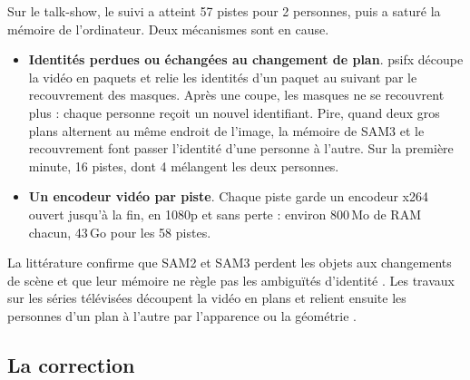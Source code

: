 \documentclass[11pt,a4paper]{report}
\begin{document}
Sur le talk-show, le suivi a atteint 57 pistes pour 2 personnes, puis a saturé la mémoire de l'ordinateur. Deux
mécanismes sont en cause.
\begin{itemize}
    \item \textbf{Identités perdues ou échangées au changement de plan}. psifx découpe la vidéo en paquets et relie les
    identités d'un paquet au suivant par le recouvrement des masques. Après une coupe, les masques ne se recouvrent
    plus : chaque personne reçoit un nouvel identifiant. Pire, quand deux gros plans alternent au même endroit de
    l'image, la mémoire de SAM3 et le recouvrement font passer l'identité d'une personne à l'autre. Sur la première
    minute, 16 pistes, dont 4 mélangent les deux personnes.
    \item \textbf{Un encodeur vidéo par piste}. Chaque piste garde un encodeur x264 ouvert jusqu'à la fin, en 1080p et
    sans perte : environ 800\,Mo de RAM chacun, 43\,Go pour les 58 pistes.
\end{itemize}
La littérature confirme que SAM2 et SAM3 perdent les objets aux changements de scène et que leur mémoire ne règle pas
les ambiguïtés d'identité \cite{pvuw2026reprompt}. Les travaux sur les séries télévisées découpent la vidéo en plans
et relient ensuite les personnes d'un plan à l'autre par l'apparence ou la géométrie
\cite{pavlakos2022tvshows,multithumbs2026}.

\subsection{La correction}
\end{document}
